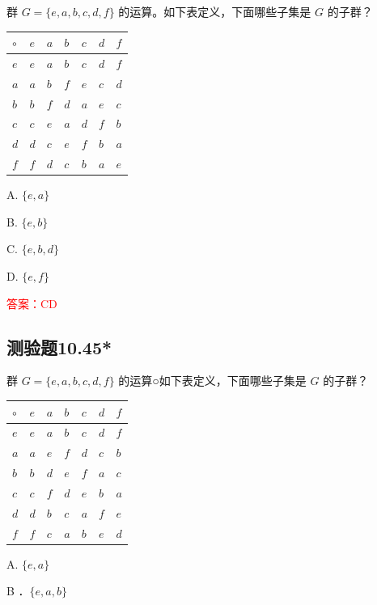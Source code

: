 \documentclass[UTF8, heading=true]{ctexart}
\begin{document}
群 $G=\{e, a, b, c, d, f\}$ 的运算。如下表定义，下面哪些子集是 $G$ 的子群？
\begin{table}[H]
  \renewcommand{\arraystretch}{1.5}
  \centering
\begin{tabular}{l|llllll}
\hline$\circ$ & $e$ & $a$ & $b$ & $c$ & $d$ & $f$ \\
\hline$e$ & $e$ & $a$ & $b$ & $c$ & $d$ & $f$ \\
$a$ & $a$ & $b$ & $f$ & $e$ & $c$ & $d$ \\
$b$ & $b$ & $f$ & $d$ & $a$ & $e$ & $c$ \\
$c$ & $c$ & $e$ & $a$ & $d$ & $f$ & $b$ \\
$d$ & $d$ & $c$ & $e$ & $f$ & $b$ & $a$ \\
$f$ & $f$ & $d$ & $c$ & $b$ & $a$ & $e$ \\
\hline
\end{tabular}
\end{table}

A. $\{e, a\}$

B. $\{e, b\}$

C. $\{e, b, d\}$

D. $\{e, f\}$

\textcolor{red}{答案：CD}

\subsection{测验题10.45*}

群 $G=\{e, a, b, c, d, f\}$ 的运算○如下表定义，下面哪些子集是 $G$ 的子群？
\begin{table}[H]
  \renewcommand{\arraystretch}{1.5}
  \centering
\begin{tabular}{l|llllll}
\hline$\circ$ & $e$ & $a$ & $b$ & $c$ & $d$ & $f$ \\
\hline$e$ & $e$ & $a$ & $b$ & $c$ & $d$ & $f$ \\
$a$ & $a$ & $e$ & $f$ & $d$ & $c$ & $b$ \\
$b$ & $b$ & $d$ & $e$ & $f$ & $a$ & $c$ \\
$c$ & $c$ & $f$ & $d$ & $e$ & $b$ & $a$ \\
$d$ & $d$ & $b$ & $c$ & $a$ & $f$ & $e$ \\
$f$ & $f$ & $c$ & $a$ & $b$ & $e$ & $d$ \\
\hline
\end{tabular}
\end{table}

A. $\{e, a\}$

B ．$\{e, a, b\}$
\end{document}
